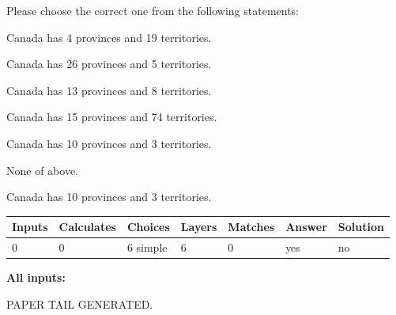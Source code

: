 \documentclass[12pt]{article}
\begin{document}
  
Please choose the correct one from the following statements:
 
 
Canada has   4 provinces and  19 territories.
 
 
Canada has  26 provinces and  5 territories.
 
 
Canada has  13 provinces and  8 territories.
 
 
Canada has  15 provinces and  74 territories.
 
 
Canada has 10  provinces and 3 territories.
 
 
 None of above.
 
 
\noindent{}
 
 
Canada has 10  provinces and 3 territories.
 
 
\noindent{}
 
 
   
   
   
   
\noindent\begin{tabular}{|l|l|l|l|l|l|l|}
 \hline
Inputs & Calculates & Choices & Layers & Matches & Answer & Solution \\ \hline
 0  & 
 0  & 
 6
  simple  
  & 
 6  & 
 0  & 
  yes & 
  no 
  \\ \hline
 \end{tabular}
   
   
   
   
\noindent{}
   
   
   
   
\noindent\vspace{0.1in}\hspace{-0.08in} {\textbf{\Large{All inputs: }}}
   
   
   
   
   
   
 \vspace{0.2in}
 
   
   
\vspace{2.0in} PAPER TAIL GENERATED.
   
   
   
\end{document}
